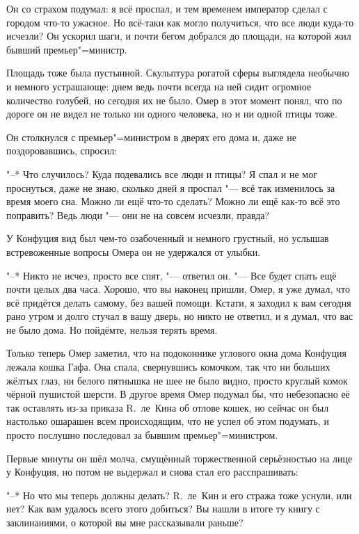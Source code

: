 Он со страхом подумал: я всё проспал, и тем временем император сделал с городом
что-то ужасное.
Но всё-таки как могло получиться, что все люди куда-то исчезли?
Он ускорил шаги, и почти бегом добрался до площади, на которой жил бывший
премьер"=министр.

Площадь тоже была пустынной.
Скульптура рогатой сферы выглядела необычно и немного устрашающе: днем ведь
почти всегда на ней сидит огромное количество голубей, но сегодня их не было.
Омер в этот момент понял, что по дороге он не видел не только ни одного человека,
но и ни одной птицы тоже.

Он столкнулся с премьер"=министром в дверях его дома и, даже не поздоровавшись,
спросил:

"--* Что случилось?
Куда подевались все люди и птицы?
Я спал и не мог проснуться, даже не знаю, сколько дней я проспал "--- всё так
изменилось за время моего сна.
Можно ли ещё что-то сделать?
Можно ли ещё как-то всё это поправить?
Ведь люди "--- они не на совсем исчезли, правда?

У Конфуция вид был чем-то озабоченный и немного грустный, но услышав
встревоженные вопросы Омера он не удержался от улыбки.

"--* Никто не исчез, просто все спят, "--- ответил он.
"--- Все будет спать ещё почти целых два часа.
Хорошо, что вы наконец пришли, Омер, я уже думал, что всё придётся делать
самому, без вашей помощи.
Кстати, я заходил к вам сегодня рано утром и долго стучал в вашу дверь, но никто
не ответил, и я думал, что вас не было дома.
Но пойдёмте, нельзя терять время.

Только теперь Омер заметил, что на подоконнике углового окна дома Конфуция
лежала кошка Гафа.
Она спала, свернувшись комочком, так что ни больших жёлтых глаз, ни белого
пятнышка не шее не было видно, просто круглый комок чёрной пушистой шерсти.
В другое время Омер подумал бы, что небезопасно её так оставлять из-за приказа
R.~ле~Кина об отлове кошек, но сейчас он был настолько ошарашен всем
происходящим, что не успел об этом подумать, и просто послушно последовал за
бывшим премьер"=министром.

Первые минуты он шёл молча, смущённый торжественной серьёзностью на лице у
Конфуция, но потом не выдержал и снова стал его расспрашивать:

"--* Но что мы теперь должны делать?
R.~ле~Кин и его стража тоже уснули, или нет?
Как вам удалось всего этого добиться?
Вы нашли в итоге ту книгу с заклинаниями, о которой вы мне рассказывали раньше?

